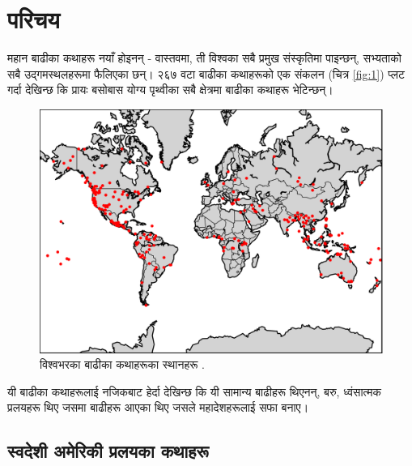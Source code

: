 \documentclass[10pt,twocolumn,letterpaper]{article}
\begin{document}
\section{परिचय}

महान बाढीका कथाहरू नयाँ होइनन् - वास्तवमा, ती विश्वका सबै प्रमुख संस्कृतिमा पाइन्छन्, सभ्यताको सबै उद्गमस्थलहरूमा फैलिएका छन्। २६७ वटा बाढीका कथाहरूको एक संकलन (चित्र \ref{fig:1}) प्लट गर्दा \cite{3} देखिन्छ कि प्रायः बसोबास योग्य पृथ्वीका सबै क्षेत्रमा बाढीका कथाहरू भेटिन्छन्।

\begin{figure}[h]
\begin{center}
   \includegraphics[width=1\linewidth]{b.png}
\end{center}
   \caption{विश्वभरका बाढीका कथाहरूका स्थानहरू \cite{3}.}
\label{fig:1}
\label{fig:onecol}
\end{figure}

यी बाढीका कथाहरूलाई नजिकबाट हेर्दा देखिन्छ कि यी सामान्य बाढीहरू थिएनन्, बरु, ध्वंसात्मक प्रलयहरू थिए जसमा बाढीहरू आएका थिए जसले महादेशहरूलाई सफा बनाए।

\subsection{स्वदेशी अमेरिकी प्रलयका कथाहरू}
\end{document}
